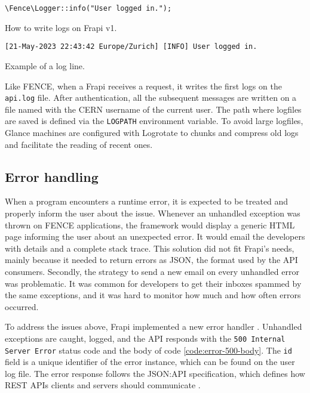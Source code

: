 \begin{listing}[htbp]
\begin{verbatim}
\Fence\Logger::info("User logged in.");
\end{verbatim}
\caption{How to write logs on Frapi v1.}
\label{code:logger-php-example}
\end{listing}

\begin{listing}[htbp]
\begin{verbatim}
[21-May-2023 22:43:42 Europe/Zurich] [INFO] User logged in.
\end{verbatim}
\caption{Example of a log line.}
\label{code:log-line-example}
\end{listing}

Like FENCE, when a Frapi receives a request, it writes the first logs on the \texttt{api.log} file. After authentication, all the subsequent messages are written on a file named with the CERN username of the current user. The path where logfiles are saved is defined via the \texttt{LOG\textunderscore PATH} environment variable. To avoid large logfiles, Glance machines are configured with Logrotate \cite{logrotate-man} to chunks and compress old logs and facilitate the reading of recent ones.

\subsection{Error handling}
\label{sec:error-handling}

When a program encounters a runtime error, it is expected to be treated and properly inform the user about the issue. Whenever an unhandled exception was thrown on FENCE applications, the framework would display a generic HTML page informing the user about an unexpected error. It would email the developers with details and a complete stack trace. This solution did not fit Frapi's needs, mainly because it needed to return errors as JSON, the format used by the API consumers. Secondly, the strategy to send a new email on every unhandled error was problematic. It was common for developers to get their inboxes spammed by the same exceptions, and it was hard to monitor how much and how often errors occurred.

To address the issues above, Frapi implemented a new error handler \cite{frapi-error-handler-doc}. Unhandled exceptions are caught, logged, and the API responds with the \texttt{500 Internal Server Error} status code and the body of code \autoref{code:error-500-body}. The \texttt{id} field is a unique identifier of the error instance, which can be found on the user log file. The error response follows the JSON:API specification, which defines how REST APIs clients and servers should communicate \cite{json-api-intro} \cite{json-api-error} \cite{json-api-error-example}.

